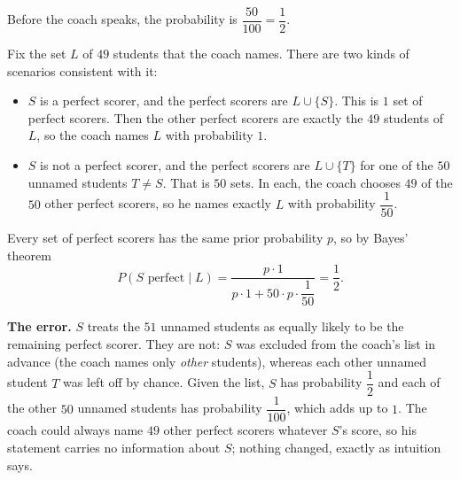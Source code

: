Before the coach speaks, the probability is $\dfrac{50}{100}=\dfrac{1}{2}$.

Fix the set $L$ of $49$ students that the coach names. There are two kinds of scenarios consistent with it:
\begin{itemize}
\item $S$ is a perfect scorer, and the perfect scorers are $L\cup\{S\}$. This is $1$ set of perfect scorers. Then the other perfect scorers are exactly the $49$ students of $L$, so the coach names $L$ with probability $1$.
\item $S$ is not a perfect scorer, and the perfect scorers are $L\cup\{T\}$ for one of the $50$ unnamed students $T\ne S$. That is $50$ sets. In each, the coach chooses $49$ of the $50$ other perfect scorers, so he names exactly $L$ with probability $\dfrac{1}{50}$.
\end{itemize}
Every set of perfect scorers has the same prior probability $p$, so by Bayes' theorem
\[
P(S\text{ perfect}\mid L)=\dfrac{p\cdot1}{p\cdot1+50\cdot p\cdot\dfrac{1}{50}}=\boxed{\dfrac{1}{2}}.
\]

\textbf{The error.} $S$ treats the $51$ unnamed students as equally likely to be the remaining perfect scorer. They are not: $S$ was excluded from the coach's list in advance (the coach names only \emph{other} students), whereas each other unnamed student $T$ was left off by chance. Given the list, $S$ has probability $\dfrac{1}{2}$ and each of the other $50$ unnamed students has probability $\dfrac{1}{100}$, which adds up to $1$. The coach could always name $49$ other perfect scorers whatever $S$'s score, so his statement carries no information about $S$; nothing changed, exactly as intuition says.
